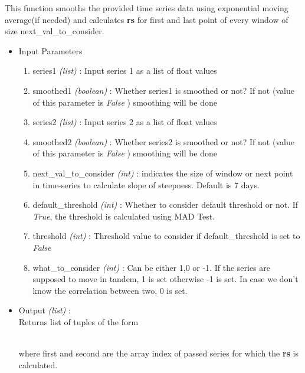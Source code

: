 This function smooths the provided time series data using exponential moving average(if needed) and 
calculates \textbf{rs} for first and last point of every window of size next{\_}val{\_}to{\_}consider.


\begin{itemize}
 \item Input Parameters
 
 \begin{enumerate}
  \item series1 \textit{(list)} : Input series 1 as a list of float values
  \item smoothed1 \textit{(boolean)} : Whether series1 is smoothed or not? If not (value of this parameter is \textit{False} ) smoothing will be done
  \item series2 \textit{(list)} : Input series 2 as a list of float values
  \item smoothed2 \textit{(boolean)} : Whether series2 is smoothed or not? If not (value of this parameter is \textit{False} ) smoothing will be done
  \item next{\_}val{\_}to{\_}consider \textit{(int)} : indicates the size of window or next point in time-series to calculate slope of steepness. Default is 7 days.
  \item default{\_}threshold \textit{(int)} : Whether to consider default threshold or not. If \textit{True}, the threshold is calculated using MAD Test.
  \item threshold \textit{(int)} : Threshold value to consider if default\_threshold is set to \textit{False}
  \item what{\_}to{\_}consider \textit{(int)} : Can be either 1,0 or -1. If the series are supposed to move in tandem, 1 is set otherwise -1 is set. In case we don't know the correlation between two, 0 is set.
  \end{enumerate}

 \item Output \textit{(list)} : \\
  Returns list of tuples of the form \\
  \\
  \begin{flushleft}
 where first and second are the array index of passed series for which the \textbf{rs} is calculated.
 \end{flushleft}
\end{itemize}

